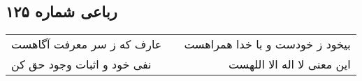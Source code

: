 \begin{center}
\section*{رباعی شماره ۱۲۵}
\label{sec:sh125}
\begin{longtable}{l p{0.5cm} r}
عارف که ز سر معرفت آگاهست
&&
بیخود ز خودست و با خدا همراهست
\\
نفی خود و اثبات وجود حق کن
&&
این معنی لا اله الا اللهست
\\
\end{longtable}
\end{center}
